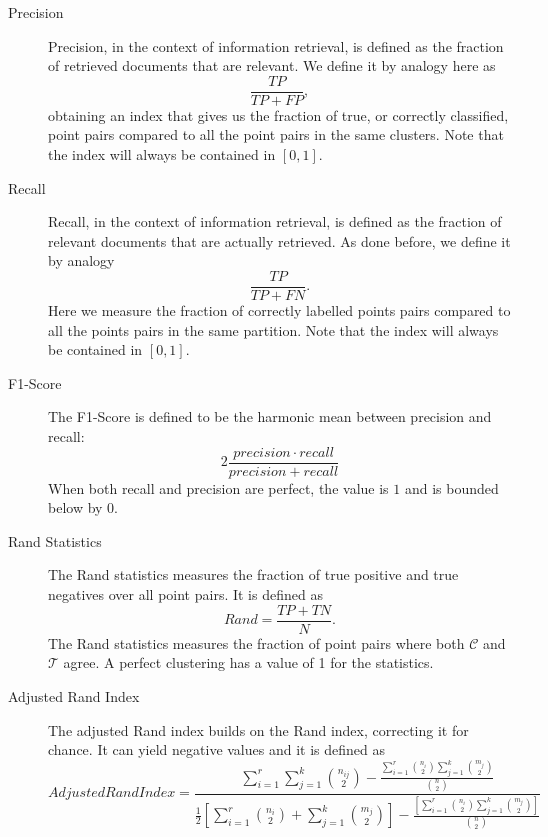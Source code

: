 \documentclass[a4paper]{article}
\begin{document}
		\begin{description}
			\item[Precision] Precision, in the context of information retrieval, is defined as the fraction of retrieved documents that are relevant. We define it by analogy here as
			\begin{equation*}
			\frac{TP}{TP + FP},
			\end{equation*}
			obtaining an index that gives us the fraction of true, or correctly classified, point pairs compared to all the point pairs in the same clusters. Note that the index will always be contained in $\left[0,1\right]$.
			\item[Recall] Recall, in the context of information retrieval, is defined as the fraction of relevant documents that are actually retrieved. As done before, we define it by analogy
			\begin{equation*}
			\frac{TP}{TP + FN}.
			\end{equation*}
			Here we measure the fraction of correctly labelled points pairs compared to all the points pairs in the same partition. Note that the index will always be contained in $\left[0,1\right]$.
			\item[F1-Score] The F1-Score is defined to be the harmonic mean between precision and recall:
			\begin{equation*}
			2\frac{precision \cdot recall}{precision + recall}
			\end{equation*}
			When both recall and precision are perfect, the value is $1$ and is bounded below by $0$.
			\item[Rand Statistics] The Rand statistics measures the fraction of true positive and true negatives over all point pairs. It is defined as
			\begin{equation*}
			Rand = \frac{TP+ TN}{N}.
			\end{equation*}
			The Rand statistics measures the fraction of point pairs where both $\mathcal{C}$ and $\mathcal{T}$ agree. A perfect clustering has a value of 1 for the statistics.
			\item[Adjusted Rand Index] The adjusted Rand index builds on the Rand index, correcting it for chance. It can yield negative values and it is defined as
			\begin{equation*}
			Adjusted Rand Index = \frac{\sum_{i=1}^{r} \sum_{j=1}^{k} {n_{ij}\choose{2}} - \frac{\sum_{i=1}^{r}{n_{i}\choose{2}}  \sum_{j=1}^{k}{m_{j}\choose{2}}}{{{n}\choose{2}}}}{\frac{1}{2}\left[\sum_{i=1}^{r} {{n_{i}}\choose{2}} + \sum_{j=1}^{k} {{m_{j}}\choose{2}} \right] - \frac{\left[\sum_{i=1}^{r} {{n_{i}}\choose{2}}  \sum_{j=1}^{k} {{m_{j}}\choose{2}} \right]}{{{n}\choose{2}}}}
			\end{equation*}
		\end{description}
\end{document}
